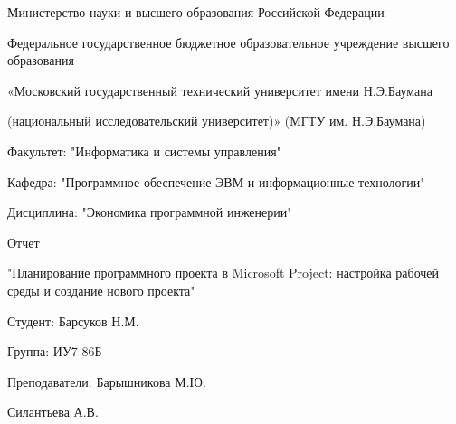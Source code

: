 \begin{center}
	Министерство науки и высшего образования Российской Федерации
	
	
	Федеральное государственное бюджетное образовательное учреждение высшего образования
	
	
	«Московский государственный технический университет имени Н.Э.Баумана
	
	
	(национальный исследовательский университет)» (МГТУ им. Н.Э.Баумана)
\end{center}

\vspace{8ex}

\begin{flushleft}
	Факультет: "Информатика и системы управления"
	
	Кафедра: "Программное обеспечение ЭВМ и информационные технологии"
	
	Дисциплина: "Экономика программной инженерии"
\end{flushleft}
\vspace{5ex}
\begin{center}
	Отчет
	
	"Планирование программного проекта в Microsoft Project: настройка рабочей среды и создание нового проекта"
\end{center}

\vspace{5ex}

\begin{flushright}
	Студент: Барсуков Н.М.
	
	Группа: ИУ7-86Б
	
	Преподаватели: Барышникова М.Ю. 
	
	Силантьева А.В.
\end{flushright}